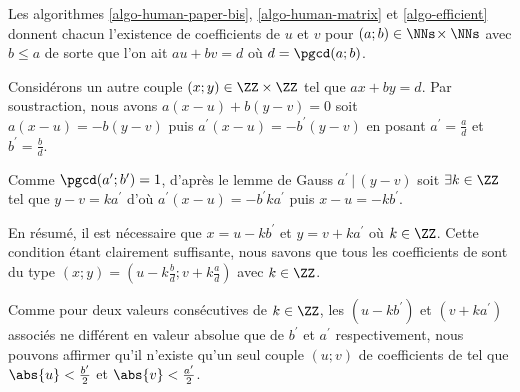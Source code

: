 Les algorithmes \ref{algo-human-paper-bis}, \ref{algo-human-matrix} et \ref{algo-efficient} donnent chacun l'existence de coefficients de \bb{} $u$ et $v$ pour $(a ; b) \in \NNs \!\times \NNs$ avec $b \leq a$ de sorte que l'on ait $a u + b v = d$ où $d = \pgcd(a ; b)$.


\medskip


Considérons un autre couple $(x ; y) \in \ZZ \times \ZZ$ tel que $a x + b y = d$. Par soustraction, nous avons $a(x - u) + b(y - v) = 0$ soit $a(x - u) = - b(y - v)$ puis $a^\prime(x - u) = - b^\prime(y - v)$ en posant $a^\prime = \frac{a}{d}$ et  $b^\prime = \frac{b}{d}$.


\medskip


Comme $\pgcd(a^\prime ; b^\prime) = 1$, d'après le lemme de Gauss $a^\prime \,|\, (y - v)$ soit $\exists k \in \ZZ$ tel que $y - v = k a^\prime$ d'où $a^\prime(x - u) = - b^\prime k a^\prime$ puis $x - u = - k b^\prime$. 


\medskip


En résumé, il est nécessaire que $x = u - k b^\prime$ et $y = v + k a^\prime$ où $k \in \ZZ$. Cette condition étant clairement suffisante, nous savons que tous les coefficients de \bb{} sont du type $(x ; y) = (u - k \frac{b}{d} ; v + k \frac{a}{d})$ avec $k \in \ZZ$.


\begin{remark}
	Comme pour deux valeurs consécutives de $k \in \ZZ$, les $(u - k b^\prime)$ et $(v + k a^\prime)$ associés ne différent en valeur absolue que de $b^\prime$ et $a^\prime$ respectivement, nous pouvons affirmer qu'il n'existe qu'un seul couple $(u ; v)$ de coefficients de \bb{} tel que $\abs{u} < \frac{b^\prime}{2}$ et $\abs{v} < \frac{a^\prime}{2}$.
\end{remark}
